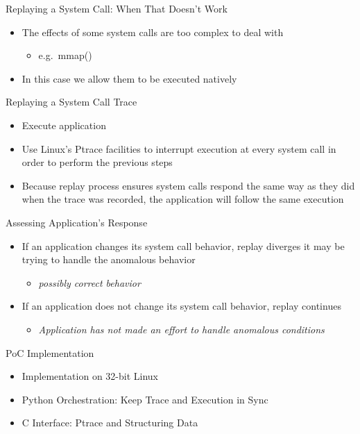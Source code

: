 \documentclass[pdf]{beamer}
\begin{document}
\begin{frame}{Replaying a System Call: When That Doesn't Work}
  \begin{itemize}
  \item{The effects of some system calls are too complex to deal with}
    \begin{itemize}
    \item{e.g.\ mmap()}
    \end{itemize}
  \item{In this case we allow them to be executed natively}
  \end{itemize}
\end{frame}


\begin{frame}{Replaying a System Call Trace}
  \begin{itemize}
  \item{Execute application}
  \item{Use Linux's Ptrace facilities to interrupt execution at every system
      call in order to perform the previous steps}
  \item{Because replay process ensures system calls respond the same way as they
      did when the trace was recorded, the application will follow the same
      execution}
  \end{itemize}
\end{frame}


\begin{frame}{Assessing Application's Response}
  \begin{itemize}
  \item{If an application changes its system call behavior, replay diverges it may
      be trying to handle the anomalous behavior}
    \begin{itemize}
    \item{\textit{possibly correct behavior}}
    \end{itemize}
  \item{If an application does not change its system call behavior, replay
      continues}
    \begin{itemize}
    \item{\textit{Application has not made an effort to handle anomalous conditions}}
    \end{itemize}
  \end{itemize}
\end{frame}


\begin{frame}{PoC Implementation}
  \begin{itemize}
  \item{Implementation on 32-bit Linux}
  \item{Python Orchestration: Keep Trace and Execution in Sync}
  \item{C Interface: Ptrace and Structuring Data}
  \end{itemize}
\end{frame}
\end{document}
